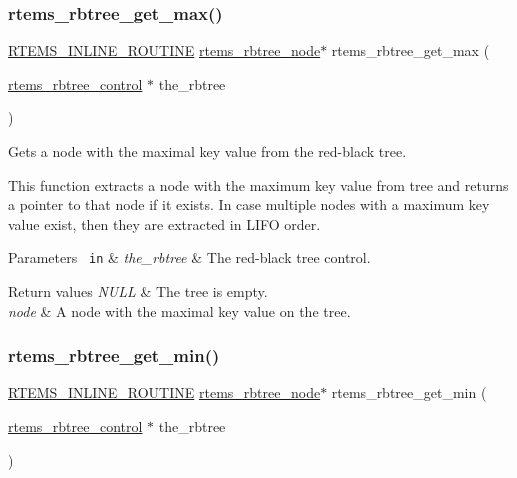 \subsubsection{\texorpdfstring{rtems\_rbtree\_get\_max()}{rtems\_rbtree\_get\_max()}}
{\footnotesize\ttfamily \mbox{\hyperlink{group__RTEMSScoreBaseDefs_gac216239df231d5dbd15e3520b0b9313f}{R\+T\+E\+M\+S\+\_\+\+I\+N\+L\+I\+N\+E\+\_\+\+R\+O\+U\+T\+I\+NE}} \mbox{\hyperlink{group__ClassicRBTrees_gaef47fc7fc61856c9afbf7f18a26ff80d}{rtems\+\_\+rbtree\+\_\+node}}$\ast$ rtems\+\_\+rbtree\+\_\+get\+\_\+max (\begin{DoxyParamCaption}\item[{\mbox{\hyperlink{group__ClassicRBTrees_ga21fe446d0b3cb8b25c814e93357753ef}{rtems\+\_\+rbtree\+\_\+control}} $\ast$}]{the\+\_\+rbtree }\end{DoxyParamCaption})}



Gets a node with the maximal key value from the red-\/black tree. 

This function extracts a node with the maximum key value from tree and returns a pointer to that node if it exists. In case multiple nodes with a maximum key value exist, then they are extracted in L\+I\+FO order.


\begin{DoxyParams}[1]{Parameters}
\mbox{\texttt{ in}}  & {\em the\+\_\+rbtree} & The red-\/black tree control.\\
\hline
\end{DoxyParams}

\begin{DoxyRetVals}{Return values}
{\em N\+U\+LL} & The tree is empty. \\
\hline
{\em node} & A node with the maximal key value on the tree. \\
\hline
\end{DoxyRetVals}
\mbox{\label{group__ClassicRBTrees_gaf2f3d6be3886b350a0ef83d4225b74bc}} 
\subsubsection{\texorpdfstring{rtems\_rbtree\_get\_min()}{rtems\_rbtree\_get\_min()}}
{\footnotesize\ttfamily \mbox{\hyperlink{group__RTEMSScoreBaseDefs_gac216239df231d5dbd15e3520b0b9313f}{R\+T\+E\+M\+S\+\_\+\+I\+N\+L\+I\+N\+E\+\_\+\+R\+O\+U\+T\+I\+NE}} \mbox{\hyperlink{group__ClassicRBTrees_gaef47fc7fc61856c9afbf7f18a26ff80d}{rtems\+\_\+rbtree\+\_\+node}}$\ast$ rtems\+\_\+rbtree\+\_\+get\+\_\+min (\begin{DoxyParamCaption}\item[{\mbox{\hyperlink{group__ClassicRBTrees_ga21fe446d0b3cb8b25c814e93357753ef}{rtems\+\_\+rbtree\+\_\+control}} $\ast$}]{the\+\_\+rbtree }\end{DoxyParamCaption})}



